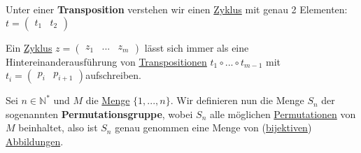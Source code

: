 \documentclass[../../main.tex]{subfiles}
\begin{document}
		\begin{definition}[Transposition]
			\label{def:Transposition}
			Unter einer \textbf{Transposition} verstehen wir einen \hyperref[def:Zyklus]{Zyklus} mit genau 2 Elementen: $t = \begin{pmatrix} t_1 & t_2 \end{pmatrix}$
		\end{definition}
	
		\begin{theorem}
			Ein \hyperref[def:Permutation]{Zyklus} $z=\begin{pmatrix} z_1 & ... & z_m\end{pmatrix}$ lässt sich immer als eine Hintereinanderausführung von \hyperref[def:Transposition]{Transpositionen} $t_1 \circ ... \circ t_{m-1}$ mit $t_i = \begin{pmatrix}p_i & p_{i+1}\end{pmatrix}$aufschreiben. 
		\end{theorem}
	
		\begin{definition}[Permutationsgruppe]
			\label{def:Permutationsgruppe}
			Sei $n \in \mathbb{N}^*$ und $M$ die \hyperref[def:Menge]{Menge} $\{1,...,n\}$. Wir definieren nun die Menge $S_n$ der sogenannten \textbf{Permutationsgruppe}, wobei $S_n$ alle möglichen \hyperref[def:Permutation]{Permutationen} von $M$ beinhaltet, also ist $S_n$ genau genommen eine Menge von (\hyperref[def:Bijektiv]{bijektiven}) \hyperref[def:Abbildung]{Abbildungen}.
		\end{definition}
	
\end{document}
